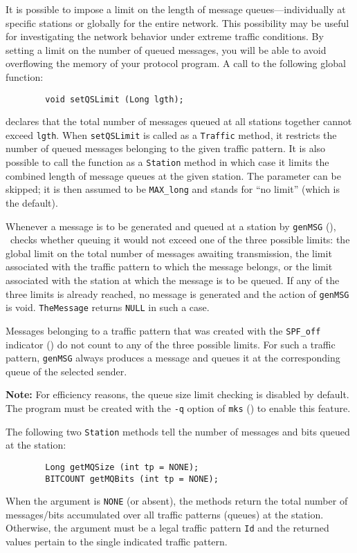 It is possible to impose a limit on the length of message queues---individually
at specific stations or globally for the entire network.
This possibility may be useful for investigating the network behavior under
extreme traffic conditions.
By setting a limit on the number of queued messages, you will be able to avoid
overflowing the memory of your protocol program.
A call to the following global function:
\begin{verbatim}
        void setQSLimit (Long lgth);
\end{verbatim}
declares that the total number of messages queued at all stations
together cannot exceed {\tt lgth}.
When {\tt setQSLimit} is called as a {\tt Traffic} method, it restricts the
number of queued messages belonging to the given traffic pattern.
It is also possible to call the function as a {\tt Station} method in which
case it limits the combined length of message queues at the given station.
The parameter can be skipped; it is then assumed to be {\tt MAX\_long} and
stands for ``no limit'' (which is the default).

Whenever a message is to be generated and queued at a station by
{\tt genMSG} (), \smurph\ checks whether queuing it
would not exceed one of the three possible limits: the global limit
on the total number of messages awaiting transmission, the limit associated
with the traffic pattern to which the message belongs, or the limit
associated with the station at which the message is to be queued.
If any of the three limits is already reached, no message is generated
and the action of {\tt genMSG} is void.
{\tt TheMessage} returns {\tt NULL} in such a case.

Messages belonging to
a traffic pattern that was created with the {\tt SPF\_off} indicator
() do not count to any of the three possible limits.
For such a traffic pattern, {\tt genMSG} always produces a message and
queues it at the corresponding queue of the selected sender.

\medskip

\noindent
{\bf Note:}
For efficiency reasons, the queue size limit checking is
disabled by default.
The program must be created with the {\tt -q} option of {\tt mks}
() to enable this feature.

\medskip
\noindent
The following two {\tt Station} methods tell the number of messages and bits
queued at the station:
\begin{verbatim}
        Long getMQSize (int tp = NONE);
        BITCOUNT getMQBits (int tp = NONE);
\end{verbatim}
\noindent
When the argument is {\tt NONE} (or absent), the methods return the total
number of messages/bits accumulated over all traffic patterns (queues) 
at the station.
Otherwise, the argument must be a legal traffic pattern {\tt Id} and the
returned values pertain to the single indicated traffic pattern.

